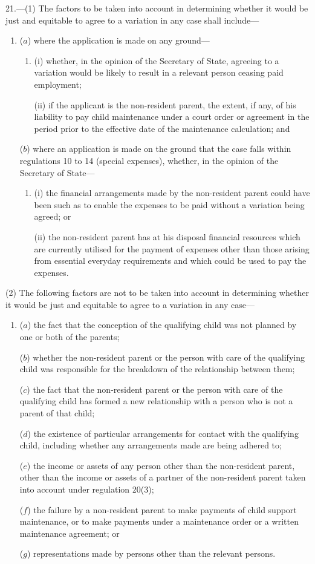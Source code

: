 \documentclass[12pt,a4paper]{article}
\begin{document}
21.---(1)  The factors to be taken into account in determining whether it would be just and equitable to agree to a variation in any case shall include—
\begin{enumerate}\item[]
($a$) where the application is made on any ground—
\begin{enumerate}\item[]
(i) whether, in the opinion of the Secretary of State, agreeing to a variation would be likely to result in a relevant person ceasing paid employment;

(ii) if the applicant is the non-resident parent, the extent, if any, of his liability to pay child maintenance under a court order or agreement in the period prior to the effective date of the maintenance calculation; and
\end{enumerate}

($b$) where an application is made on the ground that the case falls within regulations 10 to 14 (special expenses), whether, in the opinion of the Secretary of State—
\begin{enumerate}\item[]
(i) the financial arrangements made by the non-resident parent could have been such as to enable the expenses to be paid without a variation being agreed; or

(ii) the non-resident parent has at his disposal financial resources which are currently utilised for the payment of expenses other than those arising from essential everyday requirements and which could be used to pay the expenses.
\end{enumerate}
\end{enumerate}

(2) The following factors are not to be taken into account in determining whether it would be just and equitable to agree to a variation in any case—
\begin{enumerate}\item[]
($a$) the fact that the conception of the qualifying child was not planned by one or both of the parents;

($b$) whether the non-resident parent or the person with care of the qualifying child was responsible for the breakdown of the relationship between them;

($c$) the fact that the non-resident parent or the person with care of the qualifying child has formed a new relationship with a person who is not a parent of that child;

($d$) the existence of particular arrangements for contact with the qualifying child, including whether any arrangements made are being adhered to;

($e$) the income or assets of any person other than the non-resident parent, other than the income or assets of a partner of the non-resident parent taken into account under regulation 20(3);

($f$) the failure by a non-resident parent to make payments of child support maintenance, or to make payments under a maintenance order or a written maintenance agreement; or

($g$) representations made by persons other than the relevant persons.
\end{enumerate}
\end{document}
